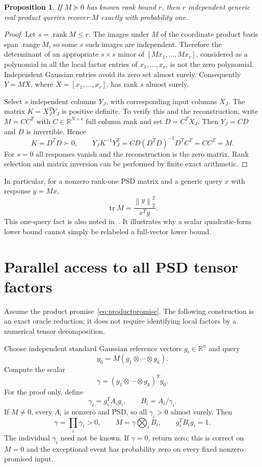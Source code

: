 \documentclass[11pt]{article}
\newtheorem{proposition}[theorem]{Proposition}
\theoremstyle{definition}\newtheorem{definition}[theorem]{Definition}
\theoremstyle{remark}\newtheorem{remark}[theorem]{Remark}
\newcommand{\R}{\mathbb R}\newcommand{\C}{\mathbb C}
\newcommand{\tr}{\operatorname{tr}}\newcommand{\rank}{\operatorname{rank}}
\newcommand{\range}{\operatorname{range}}\newcommand{\diag}{\operatorname{diag}}
\newcommand{\norm}[1]{\left\lVert#1\right\rVert}
\begin{document}
\begin{proposition}\label{prop:lowrank}
If $M\succeq0$ has known rank bound $r$, then $r$ independent generic real
product queries recover $M$ exactly with probability one.
\end{proposition}
\begin{proof}
Let $s=\rank M\le r$. The images under $M$ of the coordinate product basis span
$\range M$, so some $s$ such images are independent. Therefore the determinant
of an appropriate $s\times s$ minor of $[Mx_1,\ldots,Mx_r]$, considered as a
polynomial in all the local factor entries of $x_1,\ldots,x_r$, is not the zero
polynomial. Independent Gaussian entries avoid its zero set almost surely.
Consequently $Y=MX$, where $X=[x_1,\ldots,x_r]$, has rank $s$ almost surely.

Select $s$ independent columns $Y_J$, with corresponding input columns $X_J$.
The matrix $K=X_J^TY_J$ is positive definite. To verify this and the reconstruction,
write $M=CC^T$ with $C\in\R^{N\times s}$ full column rank and set $D=C^TX_J$.
Then $Y_J=CD$ and $D$ is invertible. Hence
\[
 K=D^TD\succ0,\qquad
 Y_JK^{-1}Y_J^T=CD(D^TD)^{-1}D^TC^T=CC^T=M.
\]
For $s=0$ all responses vanish and the reconstruction is the zero matrix.
Rank selection and matrix inversion can be performed by finite exact arithmetic.
\end{proof}

In particular, for a nonzero rank-one PSD matrix and a generic query $x$ with
response $y=Mx$,
\begin{equation}\label{eq:rankone}
 \tr M=\frac{\norm y_2^2}{x^Ty}.
\end{equation}
This one-query fact is also noted in~\cite{ma}. It illustrates why a scalar
quadratic-form lower bound cannot simply be relabeled a full-vector lower bound.

\section{Parallel access to all PSD tensor factors}
\label{sec:parallel}

Assume the product promise~\eqref{eq:productpromise}. The following construction
is an exact oracle reduction; it does not require identifying local factors by
a numerical tensor decomposition.

Choose independent standard Gaussian reference vectors $g_i\in\R^n$ and query
\[
 y_0=M(g_1\otimes\cdots\otimes g_k).
\]
Compute the scalar
\[
 \gamma=(g_1\otimes\cdots\otimes g_k)^Ty_0.
\]
For the proof only, define
\begin{equation}\label{eq:gamma}
 \gamma_i=g_i^TA_i g_i,\qquad B_i=A_i/\gamma_i.
\end{equation}
If $M\ne0$, every $A_i$ is nonzero and PSD, so all $\gamma_i>0$ almost surely.
Then
\[
 \gamma=\prod_i\gamma_i>0,\qquad M=\gamma\bigotimes_i B_i,
       \qquad g_i^TB_i g_i=1.
\]
The individual $\gamma_i$ need not be known. If $\gamma=0$, return zero; this is
correct on $M=0$ and the exceptional event has probability zero on every fixed
nonzero promised input.
\end{document}

